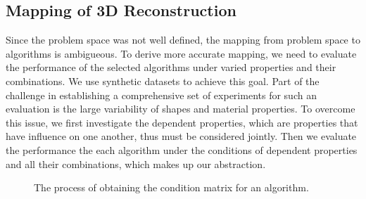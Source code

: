 \subsection{Mapping of 3D Reconstruction}
Since the problem space was not well defined, the mapping from problem space to algorithms is ambigueous. To derive more accurate mapping, we need to evaluate the performance of the selected algorithms under varied properties and their combinations. We use synthetic datasets to achieve this goal. Part of the challenge in establishing a comprehensive set of experiments for such an evaluation is the large variability of shapes and material properties. To overcome this issue, we first investigate the dependent properties, which are properties that have influence on one another, thus must be considered jointly. Then we evaluate the performance the each algorithm under the conditions of dependent properties and all their combinations, which makes up our abstraction.
\begin{figure}[!htbp]
\centering
{}
\caption{The process of obtaining the condition matrix for an algorithm.}
\label{fig:mapping_overview}
\end{figure}

